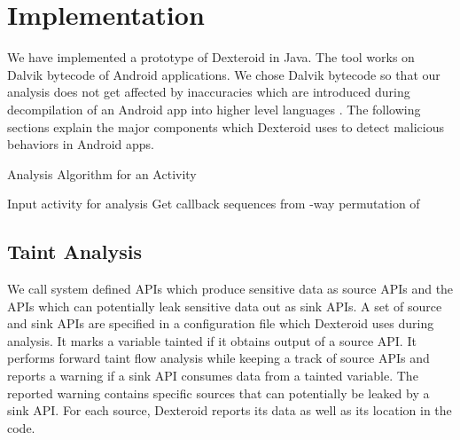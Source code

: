 \documentclass[10pt]{elsarticle}
\begin{document}
\section{Implementation}

We have implemented a prototype of Dexteroid in Java. The tool works on Dalvik bytecode of Android applications. We chose Dalvik bytecode \cite{dalvikForm, DalvikByteCode} so that our analysis does not get affected by inaccuracies which are introduced during decompilation of an Android app into higher level languages \cite{BadAndroidDecompiler, Georgiev2012}. The following sections explain the major components which Dexteroid uses to detect malicious behaviors in Android apps.



\begin{algorithm}
\caption{Analysis Algorithm for an Activity}\label{activityAnalyzer}
\begin{algorithmic}[1]
\INPUT
\Statex  \Comment Input activity for analysis
 {}
	\State  Get callback sequences from -way permutation of 
		\EndFor		
	\EndFor	
\EndProcedure
\end{algorithmic}
\end{algorithm}

\subsection {Taint Analysis} \label{taintAnalysisSec}

We call system defined APIs which produce sensitive data as source APIs and the APIs which can potentially leak sensitive data out as sink APIs. A set of source and sink APIs are specified in a configuration file which Dexteroid uses during analysis. It marks a variable tainted if it obtains output of a source API. It performs forward taint flow analysis while keeping a track of source APIs and reports a warning if a sink API consumes data from a tainted variable. The reported warning contains specific sources that can potentially be leaked by a sink API. For each source, Dexteroid reports its data as well as its location in the code.
\end{document}
